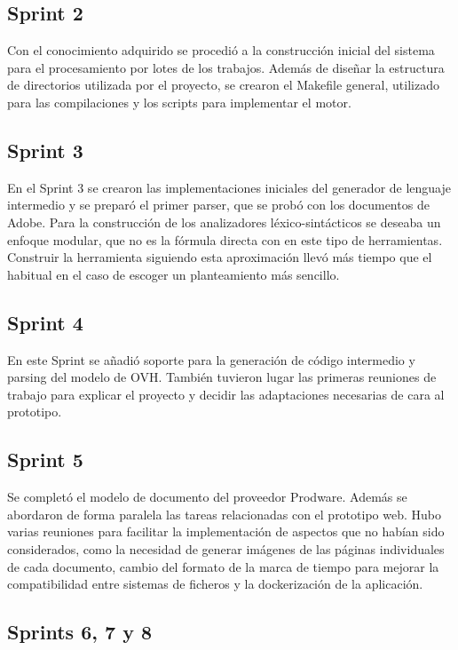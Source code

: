 \subsection{Sprint 2}

Con el conocimiento adquirido se procedió a la construcción inicial del sistema para el procesamiento por lotes de los trabajos. Además de diseñar la estructura de directorios utilizada por el proyecto, se crearon el Makefile general, utilizado para las compilaciones y los scripts para implementar el motor.

\subsection{Sprint 3}

En el Sprint 3 se crearon las implementaciones iniciales del generador de lenguaje intermedio y se preparó el primer parser, que se probó con los documentos de Adobe. Para la construcción de los analizadores léxico-sintácticos se deseaba un enfoque modular, que no es la fórmula directa con en este tipo de herramientas. Construir la herramienta siguiendo esta aproximación llevó más tiempo que el habitual en el caso de escoger un planteamiento más sencillo.

\subsection{Sprint 4}

En este Sprint se añadió soporte para la generación de código intermedio y parsing del modelo de OVH. También tuvieron lugar las primeras reuniones de trabajo para explicar el proyecto y decidir las adaptaciones necesarias de cara al prototipo.

\subsection{Sprint 5}

Se completó el modelo de documento del proveedor Prodware. Además se abordaron de forma paralela las tareas relacionadas con el prototipo web. Hubo varias reuniones para facilitar la implementación de aspectos que no habían sido considerados, como  la necesidad de generar imágenes de las páginas individuales de cada documento, cambio del formato de la marca de tiempo para mejorar la compatibilidad entre sistemas de ficheros y la dockerización de la aplicación.

\subsection{Sprints 6, 7 y 8}

